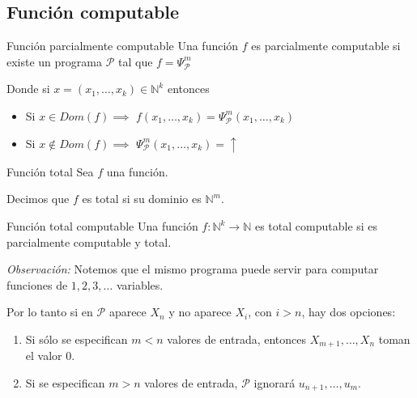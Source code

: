 \subsection{Función computable}

\begin{definicion}{Función parcialmente computable}{}
    Una función $f$ es parcialmente computable si existe un programa 
    $\mathcal{P}$ tal que $f = \Psi_{\mathcal{P}}^m$

    \medskip

    Donde si $x = (x_1, \dotsc, x_k) \in \mathbb{N}^k$ entonces
    \begin{itemize}
        \item Si $x \in Dom(f) \implies$
            $f(x_1, \dotsc, x_k) = \Psi_{\mathcal{P}}^m (x_1, \dotsc, x_k)$
    \item Si $x \notin Dom(f) \implies$
            $\Psi_{\mathcal{P}}^m (x_1, \dotsc, x_k) = \uparrow$
    \end{itemize}
\end{definicion}

\medskip

\begin{definicion}{Función total}{}
    Sea $f$ una función.

    \medskip

    Decimos que $f$ es total si su dominio es $\mathbb{N}^m$.
\end{definicion}

\medskip

\begin{definicion}{Función total computable}{}
    Una función $f: \mathbb{N}^k \to \mathbb{N}$ es total computable si es 
    parcialmente computable y total.
\end{definicion}

\bigskip
\textit{Observación:}
Notemos que el mismo programa puede servir para computar funciones de
$1, 2, 3, \dotsc$ variables.

Por lo tanto si en $\mathcal{P}$ aparece $X_n$ y no aparece $X_i$, con $i>n$,
hay dos opciones:
\begin{enumerate}
    \item Si sólo se especifican $m < n$ valores de entrada, entonces 
        $X_{m+1}, \dotsc, X_n$ toman el valor 0.
    \item Si se especifican $m>n$ valores de entrada, $\mathcal{P}$ ignorará
        $u_{n+1}, \dotsc, u_m$.
\end{enumerate}

